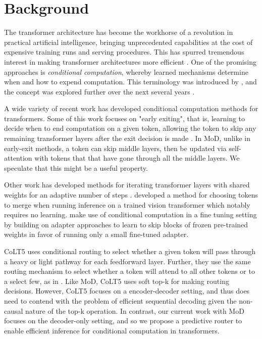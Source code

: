 \documentclass[11pt, a4paper, onecolumn, logo, copyright]{googledeepmind}
\begin{document}
\section{Background}
The transformer architecture has become the workhorse of a revolution in practical artificial intelligence, bringing unprecedented capabilities at the cost of expensive training runs and serving procedures. This has spurred tremendous interest in making transformer architectures more efficient \citep{tay_efficient, gupta2021compression}. One of the promising approaches is \textit{conditional computation}, whereby learned mechanisms determine when and how to expend computation. This terminology was introduced by \citet{bengio2013deep}, and the concept was explored further over the next several years \citep{bengio2013estimating, cho2014exponentially, graves_adaptive, jernite2017variable, bengio2016conditional, wang_skipnet}.

A wide variety of recent work has developed conditional computation methods for transformers. Some of this work focuses on "early exiting", that is, learning to decide when to end computation on a given token, allowing the token to skip any remaining transformer layers after the exit decision is made \citep{elbayad_depth, liu2021anytime, schuster2022confident}. In MoD, unlike in early-exit methods, a token can skip middle layers, then be updated via self-attention with tokens that that have gone through all the middle layers. We speculate that this might be a useful property.

Other work has developed methods for iterating transformer layers with shared weights for an adaptive number of steps \citep{simoulin-crabbe-2021-many, dehghani2018universal}. \citet{bolya2023token} developed a method for choosing tokens to merge when running inference on a trained vision transformer which notably requires no learning. \citet{lei2023conditional} make use of conditional computation in a fine tuning setting by building on adapter approaches \citep{he2021towards} to learn to skip blocks of frozen pre-trained weights in favor of running only a small fine-tuned adapter. 

CoLT5 \citep{ainslie2023colt5} uses conditional routing to select whether a given token will pass through a heavy or light pathway for each feedforward layer. Further, they use the same routing mechanism to select whether a token will attend to all other tokens or to a select few, as in \citet{guo2022longt5}. Like MoD, CoLT5 uses soft top-k for making routing decisions. However, CoLT5 focuses on a encoder-decoder setting, and thus does need to contend with the problem of efficient sequential decoding given the non-causal nature of the top-k operation. In contrast, our current work with MoD focuses on the decoder-only setting, and so we propose a predictive router to enable efficient inference for conditional computation in transformers.
\end{document}
